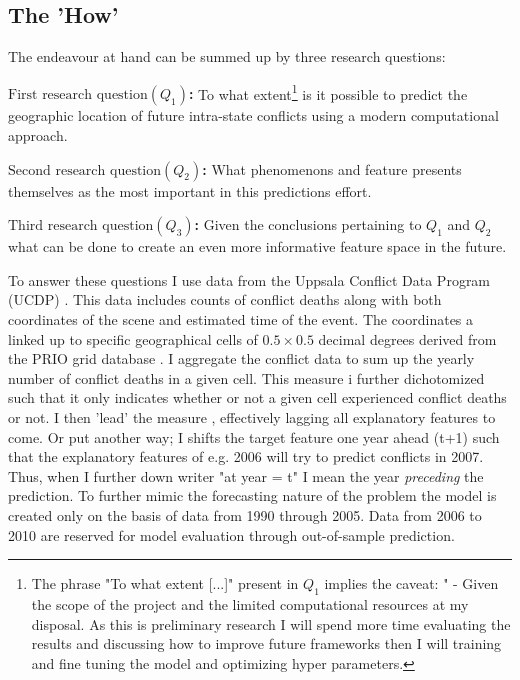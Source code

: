 \documentclass[a4paper]{article}
\begin{document}
\subsection{The 'How'}

The endeavour at hand can be summed up by three research questions:\par

\textbf{$\textrm{First research question} (Q_{1})$:} To what extent\footnote{The phrase "To what extent [...]" present in $Q_1$ implies the caveat: " - Given the scope of the project and the limited computational resources at my disposal. As this is preliminary research I will spend more time evaluating the results and discussing how to improve future frameworks then I will training and fine tuning the model and optimizing hyper parameters.} is it possible to predict the geographic location of future intra-state conflicts using a modern computational approach.\par

\textbf{$\textrm{Second research question} (Q_{2})$:} What phenomenons and feature presents themselves as the most important in this predictions effort.\par

\textbf{$\textrm{Third research question} (Q_{3})$:} Given the conclusions pertaining to $Q_1$ and $Q_2$ what can be done to create an even more informative feature space in the future.\par

To answer these questions I use data from the Uppsala Conflict Data Program (UCDP) \citep{Sundberg_2013, Croicu_Sundberg_2017}. This data includes counts of conflict deaths along with both coordinates of the scene and estimated time of the event. The coordinates a linked up to specific geographical cells of $0.5 \times 0.5$ decimal degrees derived from the PRIO grid database \citep{Tollefsen_2012}. I aggregate the conflict data to sum up the yearly number of conflict deaths in a given cell. This measure i further dichotomized such that it only indicates whether or not a given cell experienced conflict deaths or not. I then 'lead' the measure , effectively lagging all explanatory features to come. Or put another way; I shifts the target feature one year ahead
(t+1) such that the explanatory features of e.g. 2006 will try to predict conflicts in 2007. Thus, when I further down writer "at year = t" I mean the year \emph{preceding} the prediction. To further mimic the forecasting nature of the problem the model is created only on the basis of data from 1990 through 2005. Data from 2006 to 2010 are reserved for model evaluation through out-of-sample prediction.\par
\end{document}
